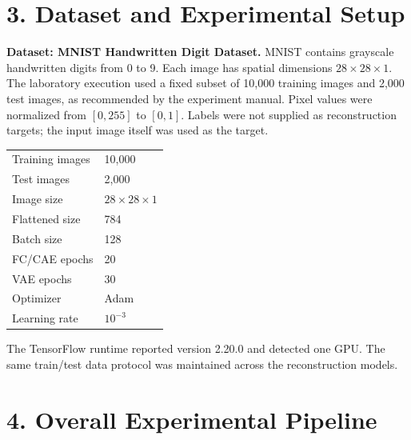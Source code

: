 \documentclass[10pt]{article}
\begin{document}
\section*{3. Dataset and Experimental Setup}
\textbf{Dataset: MNIST Handwritten Digit Dataset.} MNIST contains grayscale handwritten digits from 0 to 9. Each image has spatial dimensions $28\times28\times1$. The laboratory execution used a fixed subset of 10,000 training images and 2,000 test images, as recommended by the experiment manual. Pixel values were normalized from $[0,255]$ to $[0,1]$. Labels were not supplied as reconstruction targets; the input image itself was used as the target.

\begin{center}
\begin{tabular}{|l|l|}
\hline
Training images & 10,000\\
Test images & 2,000\\
Image size & $28\times28\times1$\\
Flattened size & 784\\
Batch size & 128\\
FC/CAE epochs & 20\\
VAE epochs & 30\\
Optimizer & Adam\\
Learning rate & $10^{-3}$\\
\hline
\end{tabular}
\end{center}

The TensorFlow runtime reported version 2.20.0 and detected one GPU. The same train/test data protocol was maintained across the reconstruction models.

\section*{4. Overall Experimental Pipeline}
\begin{center}
\end{center}
\end{document}

